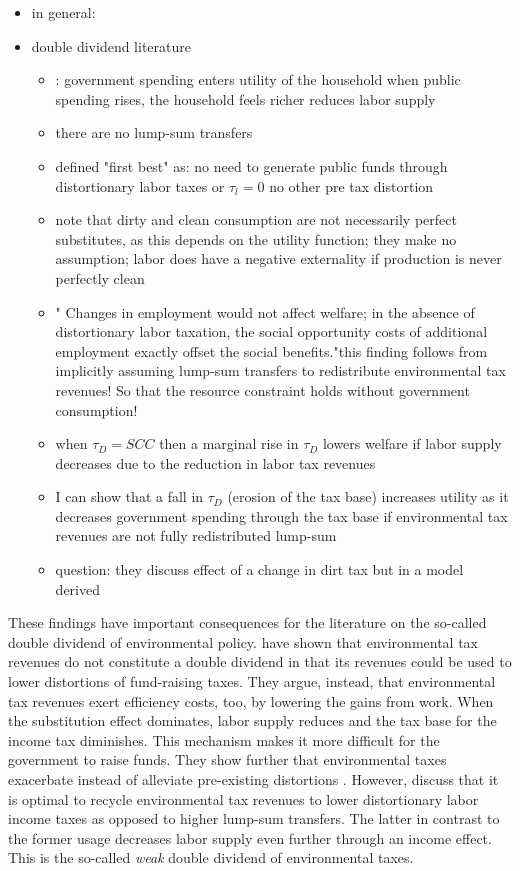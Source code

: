 \begin{itemize}
	\item in general: \cite{Fried2018TheGenerations}
	\item double dividend literature
	\begin{itemize}
		\item \cite{LansBovenberg1994EnvironmentalTaxation}: government spending enters utility of the household \ar when public spending rises, the household feels richer \ar reduces labor supply
		\item there are no lump-sum transfers
		\item defined "first best" as: no need to generate public funds through distortionary labor taxes or $\tau_l=0$ no other pre tax distortion
		\item note that dirty and clean consumption are not necessarily perfect substitutes, as this depends on the utility function; they make no assumption; \ar labor does have a negative externality if production is never perfectly clean
		\item " Changes in employment would not affect welfare; in the absence of distortionary labor taxation, the social opportunity costs of additional employment exactly offset the social benefits."\ar this finding follows from implicitly assuming lump-sum transfers to redistribute environmental tax revenues! So that the resource constraint holds without government consumption! 
		\item when $\tau_D=SCC$ then a marginal rise in $\tau_D$ lowers welfare if labor supply decreases due to the reduction in labor tax revenues
		\item I can show that a fall in $\tau_D$ (erosion of the tax base) increases utility as it decreases government spending through the tax base if environmental tax revenues are not fully redistributed lump-sum 
		\item question: they discuss effect of a change in dirt tax but in a model derived
	\end{itemize} \citep{Barrage2019OptimalPolicy}
\end{itemize}
These findings have important consequences for the literature on the so-called double dividend of environmental policy. 
\cite{LansBovenberg1994EnvironmentalTaxation} have shown that environmental tax revenues do not constitute a double dividend in that its revenues could be used to lower distortions of fund-raising taxes. 
They argue, instead, that environmental tax revenues exert efficiency costs, too, by lowering the gains from work. When the substitution effect dominates, labor supply reduces and the tax base for the income tax diminishes. This mechanism makes it more difficult for the government to raise funds. They show further that environmental taxes exacerbate instead of alleviate pre-existing distortions .  However, \cite{LansBovenberg1994EnvironmentalTaxation} discuss that it is optimal to recycle environmental tax revenues to lower distortionary labor income taxes as opposed to higher lump-sum transfers. The latter in contrast to the former usage decreases labor supply even further through an income effect. This is the so-called \textit{weak} double dividend of environmental taxes.  
